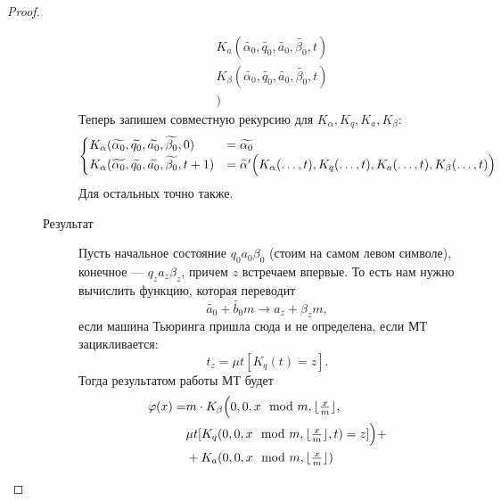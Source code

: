 \begin{proof}
\begin{description}
\begin{description}
\[\begin{aligned}
			 &K_{ a }(\widetilde{ \alpha_0} , \widetilde{ q_0} , \widetilde{ a_0}, \widetilde{ \beta_0}, t) \\ 
			 &K_{ \beta  }(\widetilde{ \alpha_0} , \widetilde{ q_0} , \widetilde{ a_0}, \widetilde{ \beta_0}, t) \\ 
			 &)
	\end{aligned}
	\]
	Теперь запишем совместную рекурсию для $ K_{ \alpha }, K_{ q}, K_{a}, K_{ \beta }$:
	\[
	\begin{aligned}
		\begin{cases}
			K_{ \alpha }(\widetilde{ \alpha _0} , \widetilde{ q_0} , \widetilde{ a_0} , \widetilde{ \beta _0} , 0) &= \widetilde{ \alpha _0} \\
			K_{ \alpha }(\widetilde{ \alpha _0} , \widetilde{ q_0} , \widetilde{ a_0} , \widetilde{ \beta _0} , t+1) &= \widetilde{ \alpha } ' \Bigl(  
				K_{ \alpha }( \ldots , t), K_{q} (\ldots , t), K_{a} (\ldots , t) , K_{ \beta }(\ldots , t)
			\Bigr)
		\end{cases}
	\end{aligned}
	\]
	Для остальных точно также.

\item[Результат] 
	Пусть начальное состояние $ q_0 a_0 \beta_0$ (стоим на самом левом символе), конечное  --- $ q_{z} a_{z} \beta _{z}$, причем $ z$ встречаем впервые. 
	То есть нам нужно вычислить функцию, которая переводит 
	$$ \widetilde{ a_0} + \widetilde{ b_0} m \longrightarrow a_z + \beta _z m,$$
	если машина Тьюринга пришла сюда и не определена, если МТ зацикливается:
	\[
		t_z = \mu t[K_{q}(t) = z]
	.\] 
	Тогда результатом работы МТ будет
	\[
	\begin{aligned}
		\varphi (x) =& m \cdot  K _{\beta} \Bigl(0, 0, x \mod m, \lfloor \tfrac{x}{m} \rfloor , \\
					 &\mu t[K_{q}(0, 0, x \mod m, \lfloor \tfrac{x}{m} \rfloor, t) = z]\Bigr) +\\ 
				   &+ K_{a}(0, 0, x \mod m, \lfloor \tfrac{x}{m} \rfloor)
	\end{aligned}
	\]
			\end{description}
    \end{description} 
\end{proof}

